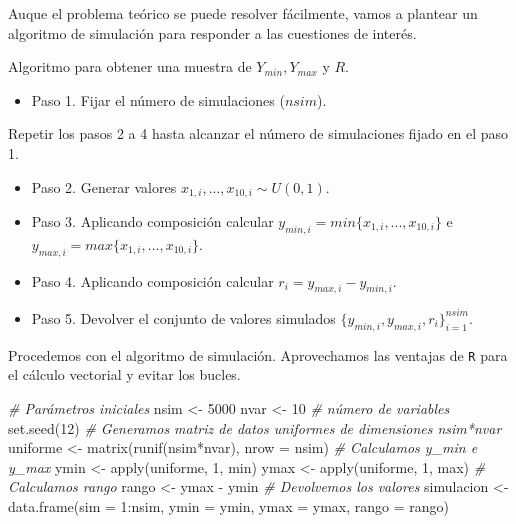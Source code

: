 \documentclass[
]{book}
\newenvironment{Shaded}{\begin{snugshade}}{\end{snugshade}}
\newcommand{\AttributeTok}[1]{\textcolor[rgb]{0.77,0.63,0.00}{#1}}
\newcommand{\CommentTok}[1]{\textcolor[rgb]{0.56,0.35,0.01}{\textit{#1}}}
\newcommand{\DecValTok}[1]{\textcolor[rgb]{0.00,0.00,0.81}{#1}}
\newcommand{\FunctionTok}[1]{\textcolor[rgb]{0.00,0.00,0.00}{#1}}
\newcommand{\NormalTok}[1]{#1}
\newcommand{\OtherTok}[1]{\textcolor[rgb]{0.56,0.35,0.01}{#1}}
\newcommand{\SpecialCharTok}[1]{\textcolor[rgb]{0.00,0.00,0.00}{#1}}
\providecommand{\tightlist}{%
  \setlength{\itemsep}{0pt}\setlength{\parskip}{0pt}}
\newenvironment{silverbox}{
  \definecolor{shadecolor}{rgb}{192, 192, 192}  
  \color{black}
  \begin{shaded}}
 {\end{shaded}}
\theoremstyle{definition}
\theoremstyle{definition}
\theoremstyle{definition}
\theoremstyle{definition}
\theoremstyle{remark}
\begin{document}
Auque el problema teórico se puede resolver fácilmente, vamos a plantear un algoritmo de simulación para responder a las cuestiones de interés.

\begin{silverbox}

Algoritmo para obtener una muestra de \(Y_{min}, Y_{max}\) y \(R\).

\begin{itemize}
\tightlist
\item
  Paso 1. Fijar el número de simulaciones (\(nsim\)).
\end{itemize}

Repetir los pasos 2 a 4 hasta alcanzar el número de simulaciones fijado en el paso 1.

\begin{itemize}
\tightlist
\item
  Paso 2. Generar valores \(x_{1,i},...,x_{10,i} \sim U(0,1)\).
\item
  Paso 3. Aplicando composición calcular \(y_{min,i} = min\{x_{1,i},...,x_{10,i}\}\) e \(y_{max,i} = max\{x_{1,i},...,x_{10,i}\}\).
\item
  Paso 4. Aplicando composición calcular \(r_{i} = y_{max,i} - y_{min,i}.\)
\item
  Paso 5. Devolver el conjunto de valores simulados \(\{y_{min,i}, y_{max,i}, r_{i}\}_{i=1}^{nsim}.\)
\end{itemize}

\end{silverbox}

Procedemos con el algoritmo de simulación. Aprovechamos las ventajas de \texttt{R} para el cálculo vectorial y evitar los bucles.

\begin{Shaded}
\begin{Highlighting}[]
\CommentTok{\# Parámetros iniciales}
\NormalTok{nsim }\OtherTok{\textless{}{-}} \DecValTok{5000}
\NormalTok{nvar }\OtherTok{\textless{}{-}} \DecValTok{10}  \CommentTok{\# número de variables}
\FunctionTok{set.seed}\NormalTok{(}\DecValTok{12}\NormalTok{)}
\CommentTok{\# Generamos matriz de datos uniformes de dimensiones nsim*nvar }
\NormalTok{uniforme }\OtherTok{\textless{}{-}} \FunctionTok{matrix}\NormalTok{(}\FunctionTok{runif}\NormalTok{(nsim}\SpecialCharTok{*}\NormalTok{nvar), }\AttributeTok{nrow =}\NormalTok{ nsim)}
\CommentTok{\# Calculamos y\_min e y\_max}
\NormalTok{ymin }\OtherTok{\textless{}{-}} \FunctionTok{apply}\NormalTok{(uniforme, }\DecValTok{1}\NormalTok{, min)}
\NormalTok{ymax }\OtherTok{\textless{}{-}} \FunctionTok{apply}\NormalTok{(uniforme, }\DecValTok{1}\NormalTok{, max)}
\CommentTok{\# Calculamos rango}
\NormalTok{rango }\OtherTok{\textless{}{-}}\NormalTok{ ymax }\SpecialCharTok{{-}}\NormalTok{ ymin}
\CommentTok{\# Devolvemos los valores }
\NormalTok{simulacion }\OtherTok{\textless{}{-}} \FunctionTok{data.frame}\NormalTok{(}\AttributeTok{sim =} \DecValTok{1}\SpecialCharTok{:}\NormalTok{nsim, }
                         \AttributeTok{ymin =}\NormalTok{ ymin, }\AttributeTok{ymax =}\NormalTok{ ymax, }
                         \AttributeTok{rango =}\NormalTok{ rango)}
\end{Highlighting}
\end{Shaded}
\end{document}
